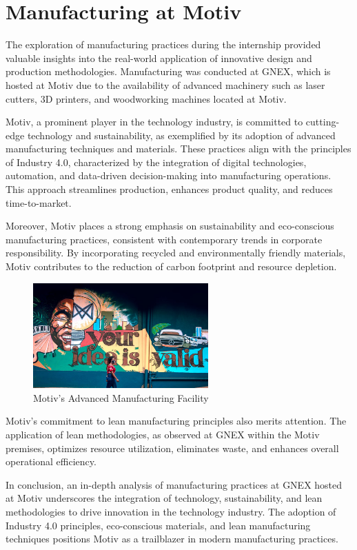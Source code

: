 \section{Manufacturing at Motiv}

The exploration of manufacturing practices during the internship provided valuable insights into the real-world application of innovative design and production methodologies. Manufacturing was conducted at GNEX, which is hosted at Motiv due to the availability of advanced machinery such as laser cutters, 3D printers, and woodworking machines located at Motiv.

Motiv, a prominent player in the technology industry, is committed to cutting-edge technology and sustainability, as exemplified by its adoption of advanced manufacturing techniques and materials. These practices align with the principles of Industry 4.0, characterized by the integration of digital technologies, automation, and data-driven decision-making into manufacturing operations. This approach streamlines production, enhances product quality, and reduces time-to-market.

Moreover, Motiv places a strong emphasis on sustainability and eco-conscious manufacturing practices, consistent with contemporary trends in corporate responsibility. By incorporating recycled and environmentally friendly materials, Motiv contributes to the reduction of carbon footprint and resource depletion.

\begin{figure}[ht]
\centering
\includegraphics[width=0.6\textwidth]{images/motiv-manufacturing.png}
\caption{Motiv's Advanced Manufacturing Facility}
\label{fig:motiv-manufacturing}
\end{figure}

Motiv's commitment to lean manufacturing principles also merits attention. The application of lean methodologies, as observed at GNEX within the Motiv premises, optimizes resource utilization, eliminates waste, and enhances overall operational efficiency.

In conclusion, an in-depth analysis of manufacturing practices at GNEX hosted at Motiv underscores the integration of technology, sustainability, and lean methodologies to drive innovation in the technology industry. The adoption of Industry 4.0 principles, eco-conscious materials, and lean manufacturing techniques positions Motiv as a trailblazer in modern manufacturing practices.
